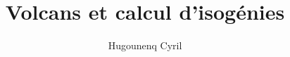 \documentclass[10pt,a4paper]{book}
\author{Hugounenq Cyril}
\title{Volcans et calcul d'isogénies}
\theoremstyle{plain}
\theoremstyle{definition}
\theoremstyle{definition}
\theoremstyle{definition}
\theoremstyle{definition}
\theoremstyle{definition}
\theoremstyle{remark}
\theoremstyle{remark}
\theoremstyle{definition}
\begin{document}
\fancyhf{}%
\fancyhead[LE]{\nouppercase\leftmark}%
\fancyhead[RO]{\nouppercase\rightmark}
\fancyfoot[C]{\thepage}%
\fancyfoot[L]{}

\setlength{\headheight}{31pt}

\renewcommand{\headrulewidth}{1pt}%
\renewcommand{\headrule}{\hbox to\headwidth{%
  \color{blue}\leaders\hrule height \headrulewidth\hfill}}
  
\renewcommand{\footrulewidth}{1pt}%
\newcommand{\footrulecolor}{green}


\setlength{\parskip}{ -1pt plus 1pt}

\newcommand{\abstracttextfont}{\normalfont}


\def\algorithmicrequire{\textbf{Entrée:}}
\def\algorithmicensure{\textbf{Sortie:}}

\renewcommand{\algorithmicend}{\textbf{fin}}
\renewcommand{\algorithmicif}{\textbf{si}}
\renewcommand{\algorithmicthen}{\textbf{alors}}
\renewcommand{\algorithmicelse}{\textbf{sinon}}
\renewcommand{\algorithmicelsif}{\algorithmicelse\ \algorithmicif}
\renewcommand{\algorithmicendif}{\algorithmicend\ \algorithmicif}
\renewcommand{\algorithmicfor}{\textbf{pour}}
\renewcommand{\algorithmicforall}{\textbf{pour tout}}
\renewcommand{\algorithmicdo}{\textbf{faire}}
\renewcommand{\algorithmicendfor}{\algorithmicend\ \algorithmicfor}
\renewcommand{\algorithmicwhile}{\textbf{tant que}}
\renewcommand{\algorithmicendwhile}{\algorithmicend\ \algorithmicwhile}
\renewcommand{\algorithmicloop}{\textbf{boucle}}
\renewcommand{\algorithmicendloop}{\algorithmicend\ \algorithmicloop}
\renewcommand{\algorithmicrepeat}{\textbf{repéter}}
\renewcommand{\algorithmicuntil}{\textbf{jusqu'à}}
\renewcommand{\algorithmicprint}{\textbf{imprimer}}
\renewcommand{\algorithmicreturn}{\textbf{retourner}}
\renewcommand{\algorithmictrue}{\textbf{Vrai}}
\renewcommand{\algorithmicfalse}{\textbf{Faux}}
\renewcommand{\listalgorithmname}{Liste des algorithmes}


\end{document}
